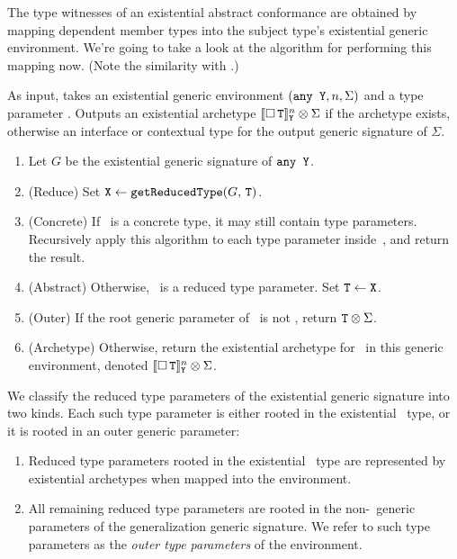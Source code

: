 \documentclass[../generics]{subfiles}
\begin{document}
The type witnesses of an existential abstract conformance are obtained by mapping dependent member types into the subject type's existential generic environment. We're going to take a look at the algorithm for performing this mapping now. (Note the similarity with .)

\begin{algorithm}\label{alg:map into existential environment}
As input, takes an existential generic environment $(\texttt{any~Y},n,\Sigma)$ and a type parameter \tT. Outputs an existential archetype $[\![\Box\,\texttt{\texttt{T}}]\!]^n_{\texttt{Y}} \otimes \Sigma$ if the archetype exists, otherwise an interface or contextual type for the output generic signature of $\Sigma$.
\begin{enumerate}
\item Let $G$ be the existential generic signature of $\texttt{any~Y}$.
\item (Reduce) Set $\texttt{X}\leftarrow\texttt{getReducedType}(G,\,\texttt{T})$.
\item (Concrete) If \tX\ is a concrete type, it may still contain type parameters. Recursively apply this algorithm to each type parameter inside~\tX, and return the result.
\item (Abstract) Otherwise, \tX\ is a reduced type parameter. Set $\texttt{T}\leftarrow\texttt{X}$.
\item (Outer) If the root generic parameter of \tT\ is not \tSelf, return $\texttt{T}\otimes\Sigma$.
\item (Archetype) Otherwise, return the existential archetype for \tT\ in this generic environment, denoted $[\![\Box\,\texttt{\texttt{T}}]\!]^n_{\texttt{Y}} \otimes \Sigma$.
\end{enumerate}
\end{algorithm}

We classify the reduced type parameters of the existential generic signature into two kinds. Each such type parameter is either rooted in the existential \tSelf\ type, or it is rooted in an outer generic parameter:
\begin{enumerate}
\item Reduced type parameters rooted in the existential \tSelf\ type are represented by existential archetypes when mapped into the environment.
\item All remaining reduced type parameters are rooted in the non-\tSelf\ generic parameters of the generalization generic signature. We refer to such type parameters as the \emph{outer type parameters} of the environment.
\end{enumerate}
\end{document}

